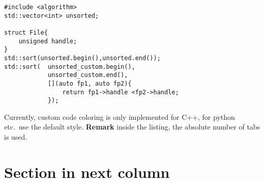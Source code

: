\documentclass[\fontheight]{extarticle}
\begin{document}
\begin{multicols*}{3}
    \begin{lstlisting}[style=bright_C++]
#include <algorithm>
std::vector<int> unsorted;

struct File{
    unsigned handle;
}
std::sort(unsorted.begin(),unsorted.end());
std::sort(  unsorted_custom.begin(),
            unsorted_custom.end(),
            [](auto fp1, auto fp2){
                return fp1->handle <fp2->handle;
            });
\end{lstlisting}
    
    Currently, custom code coloring is only implemented for C++, for python etc.\ use the default style.
    \newpar{}
    \textbf{Remark} inside the listing, the absolute number of tabs is used.
    
    \newcol{}
    
    \section{Section in next column}
    
    
\end{multicols*}
\end{document}
